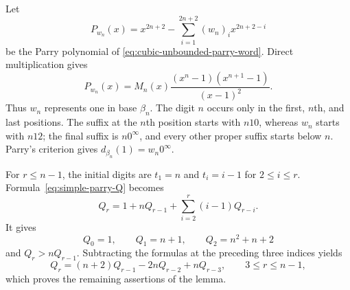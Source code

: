 Let
\[
P_{w_n}(x)=x^{2n+2}-\sum_{i=1}^{2n+2}(w_n)_ix^{2n+2-i}
\]
be the Parry polynomial of \eqref{eq:cubic-unbounded-parry-word}.  Direct
multiplication gives
\begin{equation}
P_{w_n}(x)=M_n(x)\frac{(x^n-1)(x^{n+1}-1)}{(x-1)^2}.
\label{eq:cubic-unbounded-parry-factorization}
\end{equation}
Thus $w_n$ represents one in base $\beta_n$.  The digit $n$ occurs only in
the first, $n$th, and last positions.  The suffix at the $n$th position
starts with $n10$, whereas $w_n$ starts with $n12$; the final suffix is
$n0^\infty$, and every other proper suffix starts below $n$.  Parry's
criterion gives $d_{\beta_n}(1)=w_n0^\infty$.

For $r\le n-1$, the initial digits are $t_1=n$ and $t_i=i-1$ for
$2\le i\le r$.  Formula~\eqref{eq:simple-parry-Q} becomes
\[
Q_r=1+nQ_{r-1}+\sum_{i=2}^r(i-1)Q_{r-i}.
\]
It gives
\[
Q_0=1,\qquad Q_1=n+1,\qquad Q_2=n^2+n+2
\]
and $Q_r>nQ_{r-1}$.  Subtracting the formulas at the preceding three
indices yields
\[
Q_r=(n+2)Q_{r-1}-2nQ_{r-2}+nQ_{r-3},
\qquad 3\le r\le n-1,
\]
which proves the remaining assertions of the lemma.
